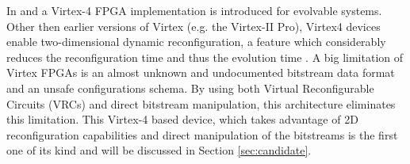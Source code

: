 \label{sec:virtex4}

In \cite{virtex4} and \cite{dpr} a Virtex-4 FPGA implementation is introduced for evolvable systems. Other then earlier versions of Virtex (e.g. the Virtex-II Pro), Virtex4 devices enable two-dimensional dynamic reconfiguration, a feature which considerably reduces the reconfiguration time and thus the evolution time \cite{virtex4}. A big limitation of Virtex FPGAs is an almost unknown and undocumented bitstream data format and an unsafe configurations schema. By using both Virtual Reconfigurable Circuits (VRCs) and direct bitstream manipulation, this architecture eliminates this limitation. This Virtex-4 based device, which takes advantage of 2D reconfiguration capabilities and direct manipulation of the bitstreams is the first one of its kind and will be discussed in Section \ref{sec:candidate}.